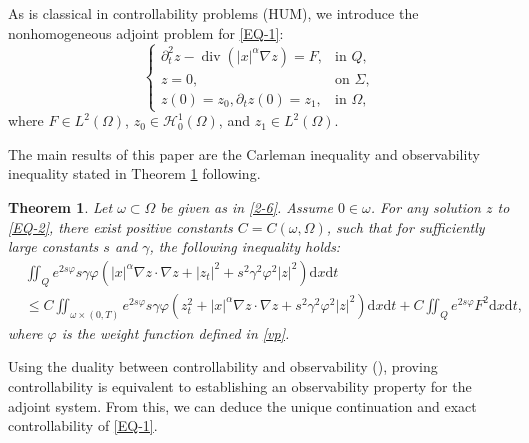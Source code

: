\documentclass[11pt]{article}
\newtheorem{theorem}{Theorem}[section]
\numberwithin{equation}{section}
\def\pt{\partial}
\def\vp{\varphi}
\def\pt{\partial}
\def\om{\omega}
\def\Om{\Omega}
\def\al{\alpha}
\def\ga{\gamma}
\def\ts{\times}
\def\df{\mathrm d}
\def\mcH{\mathcal{H}}
\DeclareMathOperator{\Div}{div}
\begin{document}
		As is classical in controllability problems (HUM), we introduce the nonhomogeneous adjoint problem for \eqref{EQ-1}:
		\begin{equation}\label{EQ-2}
			\begin{cases}
				\pt_t^2z-\Div(|x|^\al \nabla z)=F, &\mbox{in } Q,\\
				z=0, &\mbox{on }\Sigma,\\
				z(0)=z_0, \pt_tz(0)=z_1, &\mbox{in }\Om,
			\end{cases}
		\end{equation}
		where $F\in L^2(\Om)$, $z_0\in \mcH_0^1(\Om)$,  and $z_1\in L^2(\Om)$.
		
		The main results of this paper are the Carleman inequality and observability inequality stated in Theorem \ref{Carleman2}
		following.			
		\begin{theorem}\label{Carleman2}
			Let $\om\subset\Om$ be given as in \eqref{2-6}. Assume  $0\in\om$. For any solution $z$ to \eqref{EQ-2}, there exist positive constants  $C=C(\om,\Om)$, such that for sufficiently large constants
			$s$ and $\gamma$, the following inequality holds:
			\begin{equation}\label{2.3}
				\begin{split}
					&\iint_Qe^{2s\vp}s\ga \vp \left(|x|^\al \nabla z\cdot \nabla z+|z_t|^2+s^2\ga^2\vp^2|z|^2\right)\df x\df t\\
					&\leq C\iint_{\om\ts (0,T)}e^{2s\vp}s\ga \vp\left( z_t^2+|x|^\al \nabla z\cdot \nabla z +s^2\ga^2\vp^2|z|^2 \right)\df x\df t+C\iint_Qe^{2s\vp} F^2\df x\df t,
				\end{split}
			\end{equation}
	where     $\varphi$  is the weight function defined in \eqref{vp}.
		\end{theorem}
		
		Using the duality between controllability and observability   (\cite{rockafellar1967duality,lions1992remarks}), proving controllability is equivalent to establishing an observability property for the adjoint system. From this, we can deduce the unique continuation and exact controllability of \eqref{EQ-1}.
		
		
		
\end{document}
